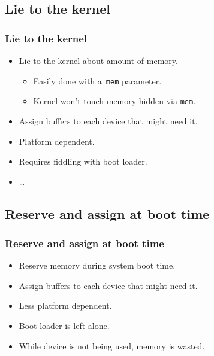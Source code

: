 
\subsection{Lie to the kernel}
\begin{frame}
  \frametitle{Lie to the kernel}

  \begin{itemize}
  \item Lie to the kernel about amount of memory.
    \begin{itemize}
    \item Easily done with a~\lstinline|mem| parameter.
    \item Kernel won't touch memory hidden via \lstinline|mem|.
    \end{itemize}
  \item Assign buffers to each device that might need it.
  \item Platform dependent.
  \item Requires fiddling with boot loader.
  \item \ldots
  \end{itemize}
\end{frame}

\subsection{Reserve and assign at boot time}
\begin{frame}
  \frametitle{Reserve and assign at boot time}

  \begin{itemize}
  \item Reserve memory during system boot time.
  \item Assign buffers to each device that might need it.
  \item Less platform dependent.
  \item Boot loader is left alone.
  \item While device is not being used, memory is wasted.
  \end{itemize}
\end{frame}

